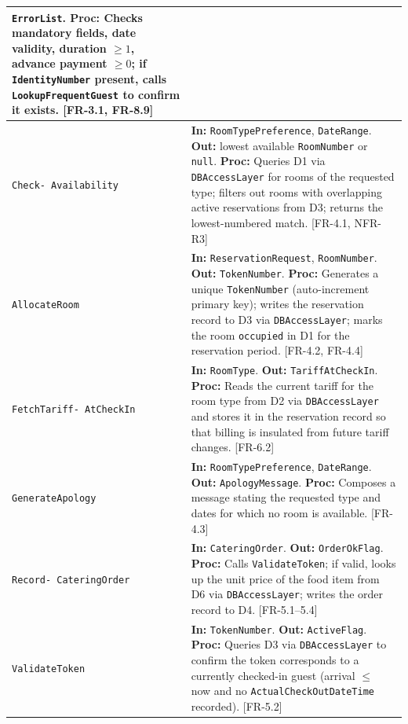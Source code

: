 \documentclass[12pt,a4paper]{article}
\begin{document}
\begin{longtable}{|L{3.2cm}|L{10.5cm}|}
      \texttt{ErrorList}.
      \textbf{Proc:} Checks mandatory fields, date validity, duration $\geq 1$,
      advance payment $\geq 0$; if \texttt{IdentityNumber} present, calls
      \texttt{LookupFrequentGuest} to confirm it exists. [FR-3.1, FR-8.9] \\
  \hline
  \texttt{Check-
  Availability}
    & \textbf{In:} \texttt{RoomTypePreference}, \texttt{DateRange}.
      \textbf{Out:} lowest available \texttt{RoomNumber} or \texttt{null}.
      \textbf{Proc:} Queries D1 via \texttt{DBAccessLayer} for rooms of the requested
      type; filters out rooms with overlapping active reservations from D3;
      returns the lowest-numbered match. [FR-4.1, NFR-R3] \\
  \hline
  \texttt{AllocateRoom}
    & \textbf{In:} \texttt{ReservationRequest}, \texttt{RoomNumber}.
      \textbf{Out:} \texttt{TokenNumber}.
      \textbf{Proc:} Generates a unique \texttt{TokenNumber} (auto-increment primary
      key); writes the reservation record to D3 via \texttt{DBAccessLayer}; marks the
      room \texttt{occupied} in D1 for the reservation period. [FR-4.2, FR-4.4] \\
  \hline
  \texttt{FetchTariff-
  AtCheckIn}
    & \textbf{In:} \texttt{RoomType}. \textbf{Out:} \texttt{TariffAtCheckIn}.
      \textbf{Proc:} Reads the current tariff for the room type from D2 via
      \texttt{DBAccessLayer} and stores it in the reservation record so that billing
      is insulated from future tariff changes. [FR-6.2] \\
  \hline
  \texttt{GenerateApology}
    & \textbf{In:} \texttt{RoomTypePreference}, \texttt{DateRange}.
      \textbf{Out:} \texttt{ApologyMessage}.
      \textbf{Proc:} Composes a message stating the requested type and dates for which
      no room is available. [FR-4.3] \\
  \hline
  \texttt{Record-
  CateringOrder}
    & \textbf{In:} \texttt{CateringOrder}. \textbf{Out:} \texttt{OrderOkFlag}.
      \textbf{Proc:} Calls \texttt{ValidateToken}; if valid, looks up the unit price of
      the food item from D6 via \texttt{DBAccessLayer}; writes the order record to D4.
      [FR-5.1--5.4] \\
  \hline
  \texttt{ValidateToken}
    & \textbf{In:} \texttt{TokenNumber}. \textbf{Out:} \texttt{ActiveFlag}.
      \textbf{Proc:} Queries D3 via \texttt{DBAccessLayer} to confirm the token
      corresponds to a currently checked-in guest (arrival $\leq$ now and no
      \texttt{ActualCheckOutDateTime} recorded). [FR-5.2] \\

\end{longtable}
\end{document}
